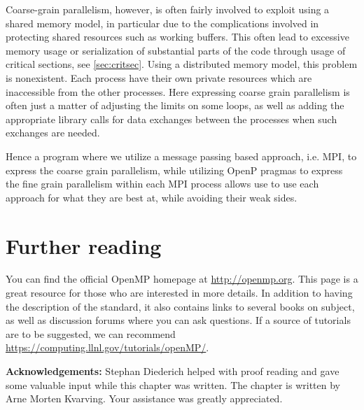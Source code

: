 Coarse-grain parallelism, however, is often fairly involved to exploit using a
shared memory model, in particular due to the complications involved in
protecting shared resources such as working buffers. This often lead to
excessive memory usage or serialization of substantial parts of the code through
usage of critical sections, see \autoref{sec:critsec}. Using a distributed
memory model, this problem is nonexistent. Each process have their own private
resources which are inaccessible from the other processes. Here expressing
coarse grain parallelism is often just a matter of adjusting the limits on some
loops, as well as adding the appropriate library calls for data exchanges
between the processes when such exchanges are needed.

Hence a program where we utilize a message passing based approach, i.e. MPI, to
express the coarse grain parallelism, while utilizing OpenP pragmas to express
the fine grain parallelism within each MPI process allows use to use each
approach for what they are best at, while avoiding their weak sides.

\section{Further reading}

You can find the official OpenMP homepage at \url{http://openmp.org}. This page
is a great resource for those who are interested in more details. In addition to
having the description of the standard, it also contains links to several books
on subject, as well as discussion forums where you can ask questions. If a
source of tutorials are to be suggested, we can recommend
\url{https://computing.llnl.gov/tutorials/openMP/}.

\textbf{Acknowledgements:} Stephan Diederich helped with proof reading and gave
some valuable input while this chapter was written. The chapter is written by
Arne Morten Kvarving. Your assistance was greatly appreciated.
